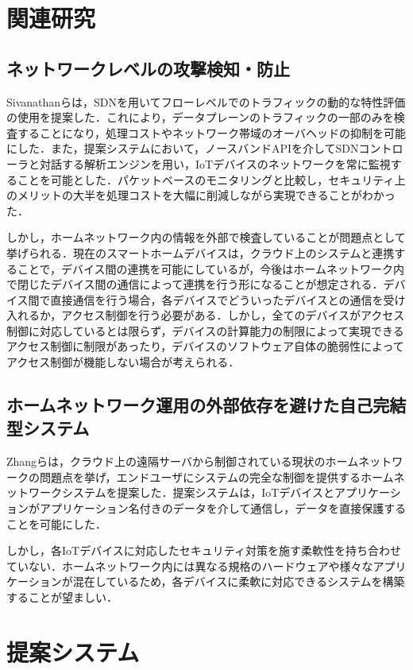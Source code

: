 \documentclass[Japanese]{dicomopapers}
\begin{document}
\section{関連研究}
\subsection*{ネットワークレベルの攻撃検知・防止}
Sivanathanらは，SDNを用いてフローレベルでのトラフィックの動的な特性評価の使用を提案した\cite{lowcost}．これにより，データプレーンのトラフィックの一部のみを検査することになり，処理コストやネットワーク帯域のオーバヘッドの抑制を可能にした．また，提案システムにおいて，ノースバンドAPIを介してSDNコントローラと対話する解析エンジンを用い，IoTデバイスのネットワークを常に監視することを可能とした．パケットベースのモニタリングと比較し，セキュリティ上のメリットの大半を処理コストを大幅に削減しながら実現できることがわかった．\par
しかし，ホームネットワーク内の情報を外部で検査していることが問題点として挙げられる．現在のスマートホームデバイスは，クラウド上のシステムと連携することで，デバイス間の連携を可能にしているが，今後はホームネットワーク内で閉じたデバイス間の通信によって連携を行う形になることが想定される\cite{d2d}．デバイス間で直接通信を行う場合，各デバイスでどういったデバイスとの通信を受け入れるか，アクセス制御を行う必要がある．しかし，全てのデバイスがアクセス制御に対応しているとは限らず，デバイスの計算能力の制限によって実現できるアクセス制御に制限があったり，デバイスのソフトウェア自体の脆弱性によってアクセス制御が機能しない場合が考えられる\cite{disap}．

\subsection{ホームネットワーク運用の外部依存を避けた自己完結型システム}
Zhangらは，クラウド上の遠隔サーバから制御されている現状のホームネットワークの問題点を挙げ，エンドユーザにシステムの完全な制御を提供するホームネットワークシステムを提案した\cite{sover}．提案システムは，IoTデバイスとアプリケーションがアプリケーション名付きのデータを介して通信し，データを直接保護することを可能にした．\par
しかし，各IoTデバイスに対応したセキュリティ対策を施す柔軟性を持ち合わせていない．ホームネットワーク内には異なる規格のハードウェアや様々なアプリケーションが混在しているため，各デバイスに柔軟に対応できるシステムを構築することが望ましい．

\section{提案システム}
\end{document}
